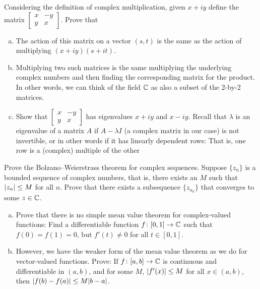 \begin{samepage}
\begin{exercise}
Considering the definition of complex multiplication, given $x +iy$
define the matrix
$\left[ \begin{smallmatrix} x & -y \\ y & x \end{smallmatrix} \right]$.
Prove that
\begin{enumerate}[a)]
\item
The action of this matrix on a vector $(s,t)$ is the same
as the action of multiplying $(x+iy)(s+it)$.
\item
Multiplying two such matrices is the same multiplying the underlying complex
numbers and then finding the corresponding matrix for the product.
In other words, we can think of the field ${\mathbb{C}}$ as also a subset of
the 2-by-2 matrices.
\item
Show that 
$\left[ \begin{smallmatrix} x & -y \\ y & x \end{smallmatrix} \right]$
has eigenvalues $x+iy$ and $x-iy$.  Recall that $\lambda$ is
an eigenvalue of a matrix $A$ if $A-\lambda I$ (a complex matrix in our case)
is not invertible, or in other words
if it has linearly dependent rows: That is, one row is a (complex) multiple
of the other
\end{enumerate}
\end{exercise}
\end{samepage}

\begin{exercise}
Prove the Bolzano--Weierstrass theorem for complex sequences.
Suppose $\{ z_n \}$ is a bounded sequence of complex numbers, that
is, there exists an $M$ such that $\lvert {z_n} \rvert \leq M$ for all $n$.  Prove
that there exists a subsequence $\{ z_{n_k} \}$ that converges to some $z
\in {\mathbb{C}}$.
\end{exercise}

\begin{exercise}
\leavevmode
\begin{enumerate}[a)]
\item
Prove that there is no simple mean value theorem for complex-valued
functions:  Find a differentiable function $f \colon [0,1] \to {\mathbb{C}}$ such that
$f(0) = f(1) = 0$, but $f'(t) \not= 0$ for all $t \in [0,1]$.
\item
However, we have the weaker form of the mean value theorem as we do for vector-valued
functions.  Prove: If $f \colon [a,b] \to {\mathbb{C}}$ is continuous and differentiable in
$(a,b)$, and for some $M$, $\lvert {f'(x)} \rvert \leq M$ for all $x \in (a,b)$, then
$\lvert {f(b)-f(a)} \rvert \leq M \lvert {b-a} \rvert$.
\end{enumerate}
\end{exercise}

